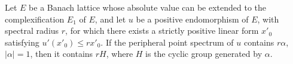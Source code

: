 Let $E$ be a Banach lattice whose absolute value can be extended to the complexification $E_1$ of $E$, and let $u$ be a positive endomorphism of $E$, with spectral radius $r$, for which there exists a strictly positive linear form $x'_0$ satisfying $u'(x'_0) \leq r x'_0$. If the peripheral point spectrum of $u$ contains $r\alpha$, $|\alpha| = 1$, then it contains $rH$, where $H$ is the cyclic group generated by $\alpha$.
